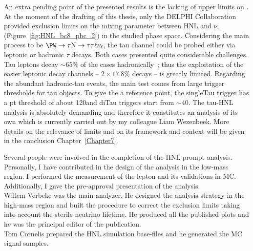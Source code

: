 An extra pending point of the presented results is the lacking of
upper limits on \mixpart. At the moment of the drafting of this
thesis, only the DELPHI Collaboration~\cite{Abreu:1996pa}  
provided exclusion limits on the mixing parameter between HNL and
$\nu_{\tau}$ (Figure~\ref{fig:HNL_bc8_pbc_2}) in the studied phase
space. Considering the main process to be
$\PW
\rightarrow \tau \hnl
\rightarrow \tau \tau \ell \nu_{\ell}$, the tau channel could be
probed either via leptonic or hadronic $\tau$ decays. Both cases
presented quite considerable challenges. Tau leptons decay $\sim 65\%$
of the cases hadronically~\cite{pdgw}; thus the exploitation of the
easier leptonic decay channels -- $2 \times 17.8\%$ decays --
is greatly limited. Regarding the abundant hadronic-tau events, the
main test comes from large \pt trigger thresholds for
tau objects. To give the a reference point, the singleTau trigger has
a pt threshold of about
120\GeV and diTau triggers start from $\sim 40$\GeV. The
tau-HNL analysis is absolutely demanding and therefore it constitutes
an analysis of its own which is currently carried out by my colleague
Liam Wezenbeek. More details on the relevance of \mixpart limits and on its
framework and context will be given in the conclusion
Chapter~\ref{Chapter7}.\\

\vspace{3cm}

Several people were involved in the completion of the HNL prompt
analysis.\\
Personally, I have contributed in the design of the analysis in the low-mass
region. I performed the measurement of the lepton \fr and its
validations in MC.\\
Additionally, I gave the pre-approval presentation of the analysis.\\
Willem Verbeke was the main analyzer. He designed the analysis strategy in the
high-mass region and built the procedure to
correct the exclusion limits taking into account the sterile neutrino
lifetime. He produced all the published plots and he was the principal
editor of the publication.\\
Tom Cornelis prepared the HNL simulation base-files and
he generated the MC signal samples. 

